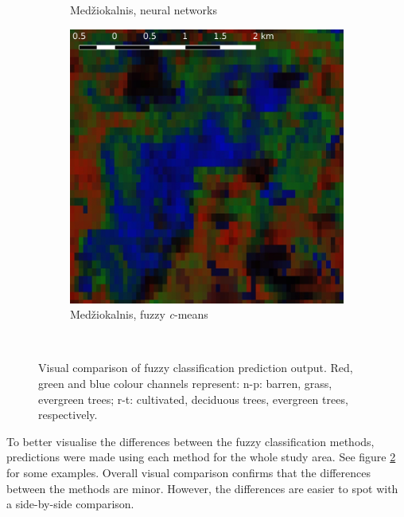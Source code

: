 \documentclass[a4paper,12pt]{scrbook}
\begin{document}
\begin{figure}
\begin{subfigure}[t]{.23\textwidth}
    \caption{Med\v{z}iokalnis, neural networks}
  \end{subfigure} \hfill
  \begin{subfigure}[t]{.23\textwidth}
    \includegraphics[width=\textwidth]{thesis-figures/figures-qgis/medziokalnis-cm}
    \caption{Med\v{z}iokalnis, fuzzy \textit{c}-means}
    \label{subfig-medziokalnis-cm}
  \end{subfigure} \
  \caption{Visual comparison of fuzzy classification prediction output. Red, green and blue colour channels represent: n-p: barren, grass, evergreen trees; r-t: cultivated, deciduous trees, evergreen trees, respectively.}
  \label{fig-visualcomparison}
\end{figure}


To better visualise the differences between the fuzzy classification methods, predictions were made using each method for the whole study area. See figure \ref{fig-visualcomparison} for some examples. Overall visual comparison confirms that the differences between the methods are minor. However, the differences are easier to spot with a side-by-side comparison.
\end{document}
